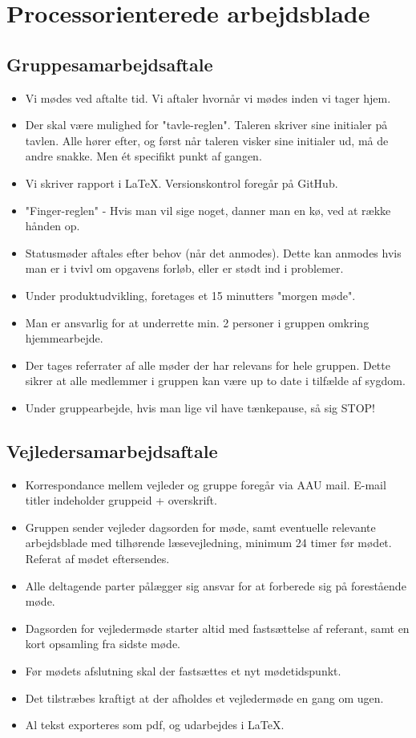 \documentclass[article,oneside,12pt]{memoir}
\begin{document}
\chapter{Processorienterede arbejdsblade}
\section{Gruppesamarbejdsaftale}
\begin{itemize}
    \item Vi mødes ved aftalte tid. Vi aftaler hvornår vi mødes inden vi tager hjem.
    \item Der skal være mulighed for "tavle-reglen". Taleren skriver sine initialer på tavlen. Alle hører efter, og først når taleren visker sine initialer ud, må de andre snakke. Men ét specifikt punkt af gangen.
    \item Vi skriver rapport i LaTeX. Versionskontrol foregår på GitHub.
    \item "Finger-reglen" - Hvis man vil sige noget, danner man en kø, ved at række hånden op.
    \item Statusmøder aftales efter behov (når det anmodes). Dette kan anmodes hvis man er i tvivl om opgavens forløb, eller er stødt ind i problemer.
    \item Under produktudvikling, foretages et 15 minutters "morgen møde".
    \item Man er ansvarlig for at underrette min. 2 personer i gruppen omkring hjemmearbejde.
    \item Der tages referrater af alle møder der har relevans for hele gruppen. Dette sikrer at alle medlemmer i gruppen kan være up to date i tilfælde af sygdom.
    \item Under gruppearbejde, hvis man lige vil have tænkepause, så sig STOP!
\end{itemize}
\clearpage
\section{Vejledersamarbejdsaftale}
\begin{itemize}
    \item Korrespondance mellem vejleder og gruppe foregår via AAU mail. E-mail titler indeholder gruppeid + overskrift.
    \item Gruppen sender vejleder dagsorden for møde, samt eventuelle relevante arbejdsblade med tilhørende læsevejledning, minimum 24 timer før mødet. Referat af mødet eftersendes.
    \item Alle deltagende parter pålægger sig ansvar for at forberede sig på forestående møde.
    \item Dagsorden for vejledermøde starter altid med fastsættelse af referant, samt en kort opsamling fra sidste møde.
    \item Før mødets afslutning skal der fastsættes et nyt mødetidspunkt.
    \item Det tilstræbes kraftigt at der afholdes et vejledermøde en gang om ugen.
    \item Al tekst exporteres som pdf, og udarbejdes i LaTeX.
\end{itemize}
\clearpage
\end{document}
